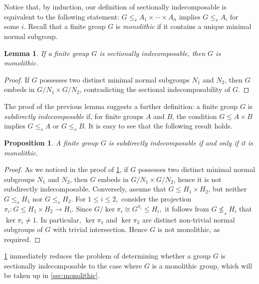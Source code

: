 \documentclass[a4paper,10pt]{amsart}
\theoremstyle{plain}
\newtheorem{lemma}[thm]{Lemma}
\newtheorem{proposition}[thm]{Proposition}
\theoremstyle{definition}
\begin{document}
Notice that, by induction, our definition of sectionally indecomposable is equivalent to the following statement: $G \leq_s A_1 \times \cdots \times A_n$ implies $G \leq_s A_i$ for some $i$. Recall that a finite group $G$ is \emph{monolithic} if it contains a unique minimal normal subgroup.

\begin{lemma}\label{l:monolithic}
	If a finite group $G$ is sectionally indecomposable, then $G$ is monolithic.
\end{lemma}

\begin{proof}
	If $G$ possesses two distinct minimal normal subgroups $N_1$ and $N_2$, then $G$ embeds in $G/N_1 \times G/N_2$, contradicting the sectional indecomposability of $G$.
\end{proof}

The proof of the previous lemma suggests a further definition: a finite group $G$ is \emph{subdirectly indecomposable} if, for finite groups $A$ and $B$, the condition $G \leq A \times B$ implies $G \leq_s A$ or $G \leq_s B$. It is easy to see that the following result holds.

\begin{proposition}\label{p:monsub} A finite group $G$ is subdirectly  indecomposable if and only if it is  monolithic. 
\end{proposition}
\begin{proof}
As we noticed in the proof of \cref{l:monolithic}, if $G$ possesses two distinct minimal normal subgroups $N_1$ and $N_2$, then $G$ embeds in $G/N_1 \times G/N_2$, hence it is not subdirectly indecomposable. Conversely, assume that $G\leq H_1\times H_2$, but neither $G\leq_s H_1$ nor $G\leq_s H_2.$ For $1\leq i\leq 2,$ consider the projection $\pi_i\colon G\leq H_1\times H_2\to H_i.$ Since $G/\ker \pi_i\cong G^{\pi_i}\leq H_i,$ it follows from $G\not\leq_s H_i$ that $\ker \pi_i\neq 1$. In particular, $\ker \pi_1$ and $\ker \pi_2$ are distinct non-trivial normal subgroups of $G$ with trivial intersection. Hence $G$ is not monolithic, as required.
\end{proof}

\cref{l:monolithic} immediately reduces the problem of determining whether a group $G$ is sectionally indecomposable to the case where $G$ is a monolithic group, which will be taken up in \cref{sec:monolithic}.
\end{document}
